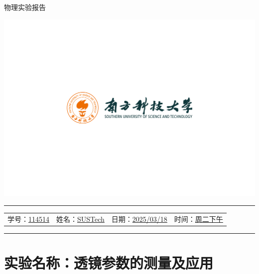 \documentclass[12pt,a4paper]{article}
\begin{document}
	\noindent
	\hspace{-2em}
	\begin{minipage}[c]{0.65\textwidth}
		\raggedright
		{\fontsize{40pt}{60pt}\selectfont 物理实验报告}
	\end{minipage}
	\begin{minipage}[c]{0.35\textwidth}
		\raggedleft
		\includegraphics[width=\linewidth, trim={20cm 20cm 20cm 20cm}, clip]{university_logo.png}
	\end{minipage}

	\vspace{-1em}
	

	
	\hrule
	\vspace{0.4em}
	\noindent
	\begin{tabular}{l l l l}
    学号：\underline{114514} & 姓名：\underline{SUSTech} &
    日期：\underline{2025/03/18} & 时间：\underline{周二下午}
	\end{tabular}
	\vspace{-0em}
	\par
	\hrule

	
	\section{实验名称：透镜参数的测量及应用}
	
\end{document}
